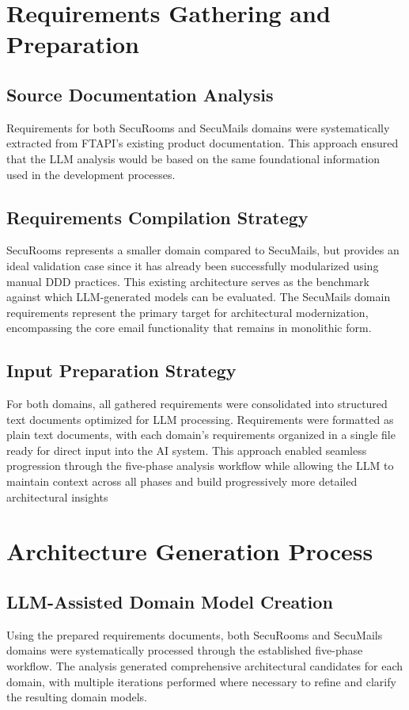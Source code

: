\section{Requirements Gathering and Preparation}

\subsection{Source Documentation Analysis}
Requirements for both SecuRooms and SecuMails domains were systematically extracted from FTAPI's existing product documentation. This approach ensured that the LLM analysis would be based on the same foundational information used in the development processes.

\subsection{Requirements Compilation Strategy}
SecuRooms represents a smaller domain compared to SecuMails, but provides an ideal validation case since it has already been successfully modularized using manual DDD practices. This existing architecture serves as the benchmark against which LLM-generated models can be evaluated. The SecuMails domain requirements represent the primary target for architectural modernization, encompassing the core email functionality that remains in monolithic form.

\subsection{Input Preparation Strategy}
For both domains, all gathered requirements were consolidated into structured text documents optimized for LLM processing. Requirements were formatted as plain text documents, with each domain's requirements organized in a single file ready for direct input into the AI system. This approach enabled seamless progression through the five-phase analysis workflow while allowing the LLM to maintain context across all phases and build progressively more detailed architectural insights

\section{Architecture Generation Process}
\subsection{LLM-Assisted Domain Model Creation}
Using the prepared requirements documents, both SecuRooms and SecuMails domains were systematically processed through the established five-phase workflow. The analysis generated comprehensive architectural candidates for each domain, with multiple iterations performed where necessary to refine and clarify the resulting domain models.

